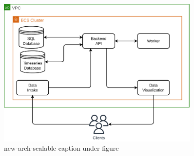 \begin{figure}[!htbp]
    \centering
    \includegraphics[width=0.90\textwidth]{img/diagrams/pdf/new-arch-scalable.drawio.pdf}
    \caption[new-arch-scalable listing]{new-arch-scalable caption under figure}
    \label{fig:new-arch-scalable}
\end{figure}
